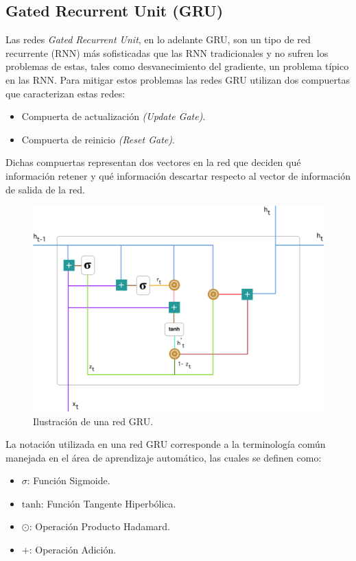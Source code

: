 \documentclass[12pt, letterpaper]{article}
\begin{document}
    \subsection{Gated Recurrent Unit (GRU)}
    Las redes \textit{Gated Recurrent Unit}, en lo adelante GRU, son un tipo de red recurrente (RNN) más sofisticadas que las RNN tradicionales y no sufren los problemas de estas, tales como desvanecimiento del gradiente, un problema típico en las RNN. Para mitigar estos problemas las redes GRU utilizan dos compuertas que caracterizan estas redes:
    \begin{itemize}
        \item Compuerta de actualización \emph{(Update Gate)}.
        \item Compuerta de reinicio \emph{(Reset Gate)}.
    \end{itemize}
    
    Dichas compuertas representan dos vectores en la red que deciden qué información retener y qué información descartar respecto al vector de información de salida de la red.

        \begin{figure}[H]
            \centering
            \includegraphics[width=0.8\linewidth]{img/gru_net.png}
            \caption{Ilustración de una red GRU.}
        \end{figure}

    La notación utilizada en una red GRU corresponde a la terminología común manejada en el área de aprendizaje automático, las cuales se definen como:
    
    \begin{itemize}
        \item $\sigma$: Función Sigmoide.
        \item $\text{tanh}$: Función Tangente Hiperbólica.
        \item $\odot$: Operación Producto Hadamard.
        \item $+$: Operación Adición. 
    \end{itemize}
\end{document}
